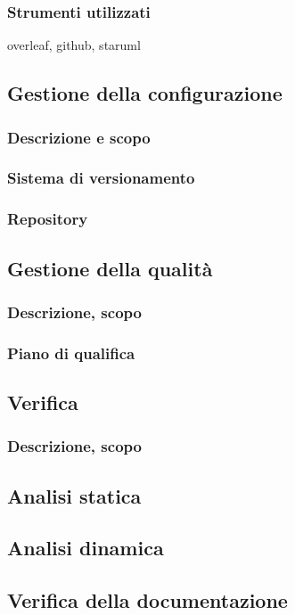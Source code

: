 \documentclass{article}
\begin{document}
\subsubsection{Strumenti utilizzati}
overleaf, github, staruml


\subsection{Gestione della configurazione}
    \subsubsection{Descrizione e scopo}
    
    \subsubsection{Sistema di versionamento}
    
    \subsubsection{Repository}

\subsection{Gestione della qualità}
    \subsubsection{Descrizione, scopo}
    \subsubsection{Piano di qualifica}

\subsection{Verifica}
    \subsubsection{Descrizione, scopo}
    \subsection{Analisi statica}
    \subsection{Analisi dinamica}
    \subsection{Verifica della documentazione}
    
\end{document}
